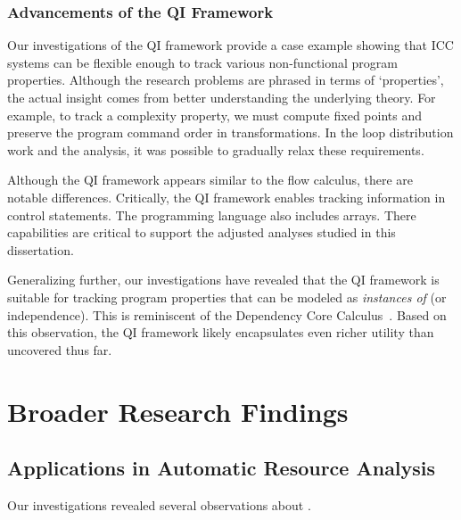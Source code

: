\subsubsection{Advancements of the QI Framework}
\label{subsubsec:qi-res}

Our investigations of the QI framework provide a case example showing that ICC
systems can be flexible enough to track various non-functional program
properties. Although the research problems are
phrased in terms of `properties', the actual insight comes from better
understanding the underlying theory. For example, to track a complexity
property, we must compute fixed points and preserve the program command order in
transformations. In the loop distribution work and the 
analysis, it was possible to gradually relax these requirements.

Although the QI framework appears similar to the flow calculus, there are
notable differences. Critically, the QI framework enables tracking information
in control statements. The programming language also includes arrays. There
capabilities are critical to support the adjusted analyses studied in this
dissertation.

Generalizing further, our investigations have revealed that the  QI framework is
suitable for tracking program properties that can be modeled as \emph{instances
of } (or independence). This is reminiscent of the
Dependency Core Calculus~\cite{abadi1999b}. Based on this observation, the QI
framework likely encapsulates even richer utility than uncovered thus far.

\section{Broader Research Findings}
\label{sec:broader-findings}

\subsection{Applications in Automatic Resource Analysis}
\label{subsec:res-resource-analysis}

Our investigations revealed several observations about .

